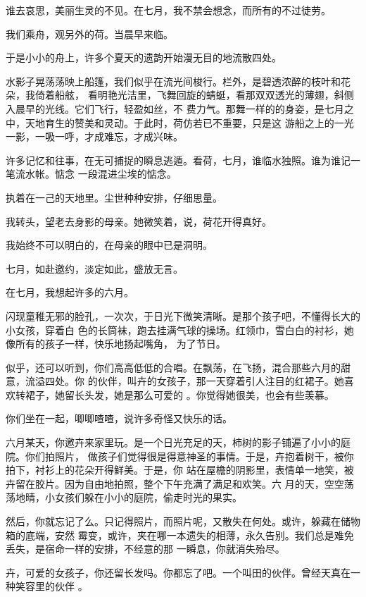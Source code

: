 \documentclass[12pt,a4paper]{article}
\begin{document}
		谁去哀思，美丽生灵的不见。在七月，我不禁会想念，而所有的不过徒劳。\par
		我们乘舟，观另外的荷。当晨早来临。\par
		于是小小的舟上，许多个夏天的遗韵开始漫无目的地流散四处。

		水影子晃荡荡映上船篷，我们似乎在流光间梭行。栏外，是碧透浓醉的枝叶和花朵，我倚着船舷，
	看明艳光洁里，飞舞回旋的蜻蜓，看那双双透光的薄翅，斜侧入晨早的光线。它们飞行，轻盈如丝，不
	费力气。那舞一样的的身姿，是七月之中，天地育生的赞美和灵动。于此时，荷仿若已不重要，只是这
	游船之上的一光一影，一吸一呼，才成难忘，才成兴味。

		许多记忆和往事，在无可捕捉的瞬息逃遁。看荷，七月，谁临水独照。谁为谁记一笔流水帐。惦念
	一段混进尘埃的惦念。

		执着在一己的天地里。尘世种种安排，仔细思量。\par
		我转头，望老去身影的母亲。她微笑着，说，荷花开得真好。\par
		我始终不可以明白的，在母亲的眼中已是洞明。\par
		七月，如赴邀约，淡定如此，盛放无言。

	\endwriting



		在七月，我想起许多的六月。

		闪现童稚无邪的脸孔，一次次，于日光下微笑清晰。是那个孩子吧，不懂得长大的小女孩，穿着白
	色的长筒袜，跑去挂满气球的操场。红领巾，雪白白的衬衫，她像所有的孩子一样，快乐地扬起嘴角，
	为了节日。

		似乎，还可以听到，你们高高低低的合唱。在飘荡，在飞扬，混合那些六月的甜意，流溢四处。你
	的伙伴，叫卉的女孩子，那一天穿着引人注目的红裙子。她喜欢转裙子，她留长头发，她是那么可爱的
	。你觉得她很美，也会有些羡慕。

		你们坐在一起，唧唧喳喳，说许多奇怪又快乐的话。

		六月某天，你邀卉来家里玩。是一个日光充足的天，柿树的影子铺遍了小小的庭院。你们拍照片，
	做孩子们觉得很是得意神圣的事情。于是，卉抱着树干，被你拍下，衬衫上的花朵开得鲜美。于是，你
	站在屋檐的阴影里，表情单一地笑，被卉留在胶片。因为自由地拍照，整个下午充满了满足和欢笑。六
	月的天，空空荡荡地晴，小女孩们躲在小小的庭院，偷走时光的果实。

		然后，你就忘记了么。只记得照片，而照片呢，又散失在何处。或许，躲藏在储物箱的底端，安然
	霉变，或许，夹在哪一本遗失的相薄，永久告别。我们总是难免丢失，是宿命一样的安排，不经意的那
	一瞬息，你就消失殆尽。

		卉，可爱的女孩子，你还留长发吗。你都忘了吧。一个叫田的伙伴。曾经天真在一种笑容里的伙伴
	。
\end{document}
